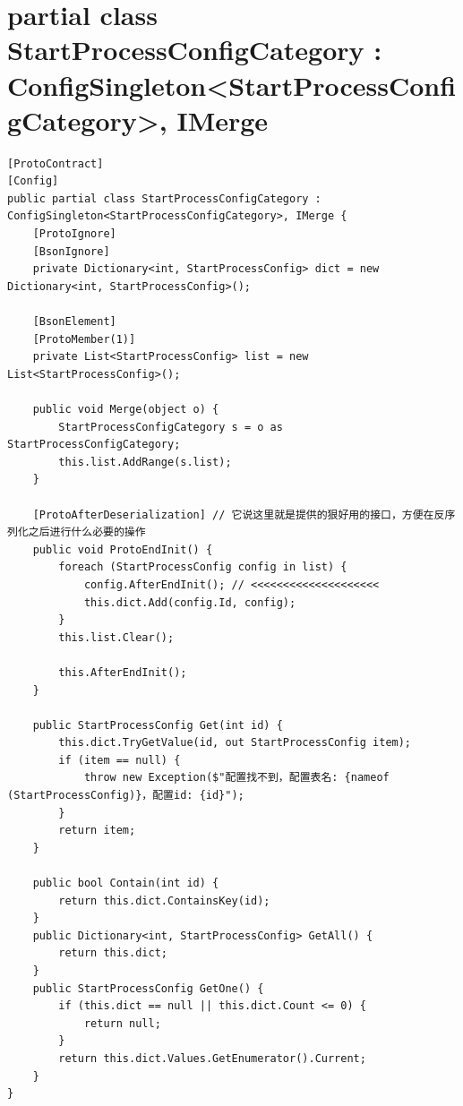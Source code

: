 \documentclass[9pt, b5paper]{article}
\begin{document}
\section{partial class StartProcessConfigCategory : ConfigSingleton<StartProcessConfigCategory>, IMerge}
\label{sec-17}
\begin{verbatim}
[ProtoContract]
[Config]
public partial class StartProcessConfigCategory : ConfigSingleton<StartProcessConfigCategory>, IMerge {
    [ProtoIgnore]
    [BsonIgnore]
    private Dictionary<int, StartProcessConfig> dict = new Dictionary<int, StartProcessConfig>();

    [BsonElement]
    [ProtoMember(1)]
    private List<StartProcessConfig> list = new List<StartProcessConfig>();

    public void Merge(object o) {
        StartProcessConfigCategory s = o as StartProcessConfigCategory;
        this.list.AddRange(s.list);
    }

    [ProtoAfterDeserialization] // 它说这里就是提供的狠好用的接口，方便在反序列化之后进行什么必要的操作       
    public void ProtoEndInit() {
        foreach (StartProcessConfig config in list) {
            config.AfterEndInit(); // <<<<<<<<<<<<<<<<<<<< 
            this.dict.Add(config.Id, config);
        }
        this.list.Clear();

        this.AfterEndInit();
    }

    public StartProcessConfig Get(int id) {
        this.dict.TryGetValue(id, out StartProcessConfig item);
        if (item == null) {
            throw new Exception($"配置找不到，配置表名: {nameof (StartProcessConfig)}，配置id: {id}");
        }
        return item;
    }

    public bool Contain(int id) {
        return this.dict.ContainsKey(id);
    }
    public Dictionary<int, StartProcessConfig> GetAll() {
        return this.dict;
    }
    public StartProcessConfig GetOne() {
        if (this.dict == null || this.dict.Count <= 0) {
            return null;
        }
        return this.dict.Values.GetEnumerator().Current;
    }
}
\end{verbatim}
\end{document}
